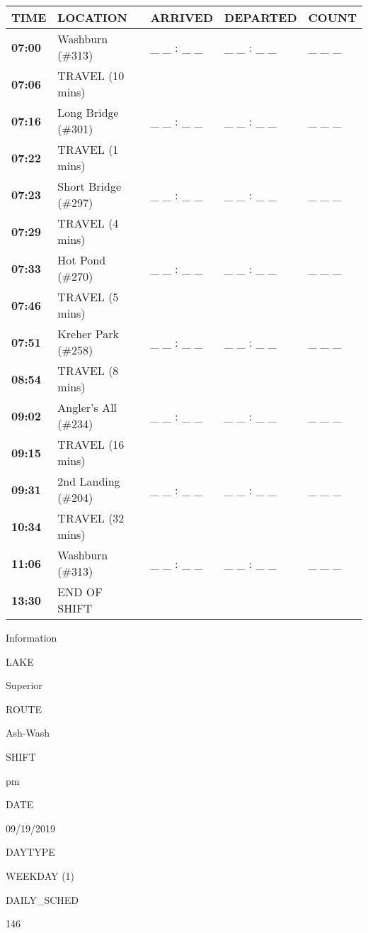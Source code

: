 \documentclass[]{article}
\begin{document}
\begin{tabular}{>{\bfseries}lllll}
\toprule
\textbf{TIME} & \textbf{LOCATION} & \textbf{ARRIVED} & \textbf{DEPARTED} & \textbf{COUNT}\\
\midrule
07:00 & Washburn (\#313) & \_ \_ : \_ \_ & \_ \_ : \_ \_ & \_ \_ \_\\
07:06 & TRAVEL (10 mins) &  &  & \\
07:16 & Long Bridge (\#301) & \_ \_ : \_ \_ & \_ \_ : \_ \_ & \_ \_ \_\\
07:22 & TRAVEL (1 mins) &  &  & \\
07:23 & Short Bridge (\#297) & \_ \_ : \_ \_ & \_ \_ : \_ \_ & \_ \_ \_\\
07:29 & TRAVEL (4 mins) &  &  & \\
07:33 & Hot Pond (\#270) & \_ \_ : \_ \_ & \_ \_ : \_ \_ & \_ \_ \_\\
07:46 & TRAVEL (5 mins) &  &  & \\
07:51 & Kreher Park (\#258) & \_ \_ : \_ \_ & \_ \_ : \_ \_ & \_ \_ \_\\
08:54 & TRAVEL (8 mins) &  &  & \\
09:02 & Angler's All (\#234) & \_ \_ : \_ \_ & \_ \_ : \_ \_ & \_ \_ \_\\
09:15 & TRAVEL (16 mins) &  &  & \\
09:31 & 2nd Landing (\#204) & \_ \_ : \_ \_ & \_ \_ : \_ \_ & \_ \_ \_\\
10:34 & TRAVEL (32 mins) &  &  & \\
11:06 & Washburn (\#313) & \_ \_ : \_ \_ & \_ \_ : \_ \_ & \_ \_ \_\\
13:30 & END OF SHIFT &  &  & \\
\bottomrule
\end{tabular}\newpage

Information

LAKE

Superior

ROUTE

Ash-Wash

SHIFT

pm

DATE

09/19/2019

DAYTYPE

WEEKDAY (1)

DAILY\_SCHED

146

\vspace{24pt}
\end{document}
